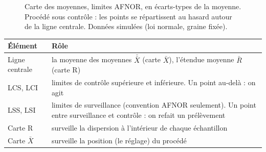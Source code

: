 \documentclass[11pt,a4paper]{article}
\newcommand{\xbb}{\bar{\bar{X}}}
\newcommand{\Rb}{\bar{R}}
\begin{document}
\begin{figure}[h]
\centering
{}
\caption{Carte des moyennes, limites AFNOR, en écarts-types de la moyenne. Procédé sous contrôle : les points se répartissent au hasard autour de la ligne centrale. Données simulées (loi normale, graine fixée).}
\end{figure}

\begin{center}\small
\begin{tabularx}{\textwidth}{@{}lX@{}}\toprule
\textbf{Élément} & \textbf{Rôle}\\\midrule
Ligne centrale & la moyenne des moyennes $\xbb$ (carte $\bar X$), l'étendue moyenne $\Rb$ (carte R)\\
LCS, LCI & limites de contrôle supérieure et inférieure. Un point au-delà : on agit\\
LSS, LSI & limites de surveillance (convention AFNOR seulement). Un point entre surveillance et contrôle : on refait un prélèvement\\
Carte R & surveille la dispersion à l'intérieur de chaque échantillon\\
Carte $\bar X$ & surveille la position (le réglage) du procédé\\\bottomrule
\end{tabularx}
\end{center}
\end{document}
